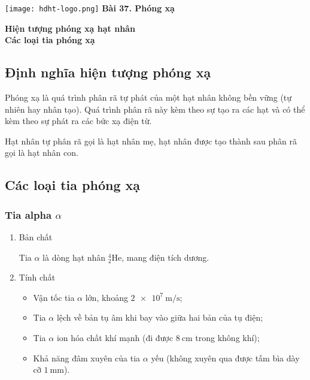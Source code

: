\newcommand{\chapter}[2][]{
	\newcommand{\chapname}{#2}
	\begin{flushleft}
		\begin{minipage}[t]{\linewidth}
			\texttt{[image: hdht-logo.png]}
			\hspace{0pt}	
			\sffamily\bfseries\large Bài  37. Phóng xạ
			\begin{flushleft}
				\huge\bfseries #1
			\end{flushleft}
		\end{minipage}
	\end{flushleft}
	\vspace{1cm}
	\normalfont\normalsize
}
\chapter[Hiện tượng phóng xạ hạt nhân \\ Các loại tia phóng xạ]{Hiện tượng phóng xạ hạt nhân\\ Các loại tia phóng xạ}

\subsection{Định nghĩa hiện tượng phóng xạ}
Phóng xạ là quá trình phân rã tự phát của một hạt nhân không bền vững (tự nhiên hay nhân tạo). Quá trình phân rã này kèm theo sự tạo ra các hạt và có thể kèm theo sự phát ra các bức xạ điện từ. 

Hạt nhân tự phân rã gọi là hạt nhân mẹ, hạt nhân được tạo thành sau phân rã gọi là hạt nhân con.
\subsection{Các loại tia phóng xạ}
\subsubsection{Tia alpha $\alpha$}					
	\begin{enumerate}[label=\alph*)]
		\item Bản chất
		
		Tia $\alpha$ là dòng hạt nhân $^4_2\text{He}$, mang điện tích dương.
		\item Tính chất
		\begin{itemize}
			\item Vận tốc tia $\alpha$ lớn, khoảng $\SI{2e7}{\meter/\second}$;
			\item Tia $\alpha$ lệch về bản tụ âm khi bay vào giữa hai bản của tụ điện;
			\item Tia $\alpha$ ion hóa chất khí mạnh (đi được $\SI{8}{\centi\meter}$ trong không khí);
			\item Khả năng đâm xuyên của tia $\alpha$ yếu (không xuyên qua được tấm bìa dày cỡ $\SI{1}{\milli\meter}$).
		\end{itemize}
	\end{enumerate}
